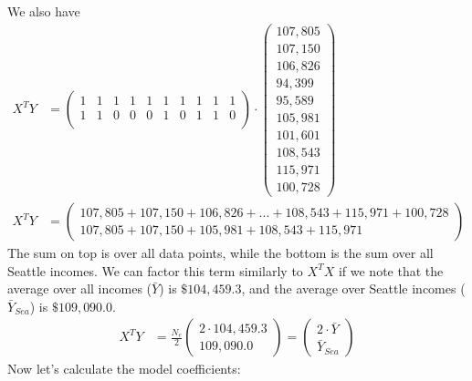 We also have
\begin{align}
X^T Y &= 
\left(\begin{array}{cccccccccc}
         1 & 1 & 1 & 1 & 1 & 1 & 1 & 1 & 1 & 1 \\
         1 & 1 & 0 & 0 & 0 & 1 & 0 & 1 & 1 & 0 \\
\end{array}\right)
\cdot
\left(\begin{array}{c}
         107,805 \\ 
         107,150 \\ 
         106,826 \\ 
          94,399 \\ 
          95,589 \\ 
         105,981 \\ 
         101,601 \\ 
         108,543 \\ 
         115,971 \\ 
         100,728 
\end{array}\right)
\\
X^T Y &= 
\left(\begin{array}{c}
         107,805 + 107,150 + 106,826 + ... + 108,543 + 115,971 + 100,728 \\
         107,805 + 107,150 + 105,981 + 108,543 + 115,971 
\end{array}\right)
\end{align}
The sum on top is over all data points, while the bottom is the sum over all
Seattle incomes.
We can factor this term similarly to $X^T X$ if we note that the average
over all incomes ($\bar{Y}$) is $\$104,459.3$, and the average over Seattle
incomes ($\bar{Y}_{Sea}$) is
$\$109,090.0$.
\begin{align}
X^T Y &= \frac{N_e}{2} 
\left(\begin{array}{c}
         2 \cdot 104,459.3 \\
         109,090.0 
\end{array}\right)
= 
\left(\begin{array}{c}
         2 \cdot \bar{Y} \\
          \bar{Y}_\mathit{Sea} 
\end{array}\right)
\end{align}
Now let's calculate the model coefficients:
